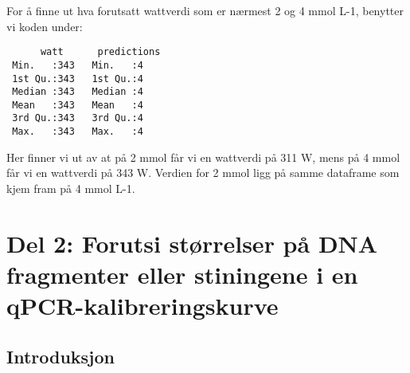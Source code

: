 \documentclass[
  letterpaper,
  DIV=11,
  numbers=noendperiod]{scrreprt}
\newenvironment{Shaded}{\begin{snugshade}}{\end{snugshade}}
\newcommand{\AttributeTok}[1]{\textcolor[rgb]{0.40,0.45,0.13}{#1}}
\newcommand{\CommentTok}[1]{\textcolor[rgb]{0.37,0.37,0.37}{#1}}
\newcommand{\DecValTok}[1]{\textcolor[rgb]{0.68,0.00,0.00}{#1}}
\newcommand{\FloatTok}[1]{\textcolor[rgb]{0.68,0.00,0.00}{#1}}
\newcommand{\FunctionTok}[1]{\textcolor[rgb]{0.28,0.35,0.67}{#1}}
\newcommand{\NormalTok}[1]{\textcolor[rgb]{0.00,0.23,0.31}{#1}}
\newcommand{\OtherTok}[1]{\textcolor[rgb]{0.00,0.23,0.31}{#1}}
\newcommand{\SpecialCharTok}[1]{\textcolor[rgb]{0.37,0.37,0.37}{#1}}
\begin{document}
For å finne ut hva forutsatt wattverdi som er nærmest 2 og 4 mmol L-1,
benytter vi koden under:

\begin{Shaded}
\end{Shaded}

\begin{verbatim}
      watt      predictions
 Min.   :343   Min.   :4   
 1st Qu.:343   1st Qu.:4   
 Median :343   Median :4   
 Mean   :343   Mean   :4   
 3rd Qu.:343   3rd Qu.:4   
 Max.   :343   Max.   :4   
\end{verbatim}

Her finner vi ut av at på 2 mmol får vi en wattverdi på 311 W, mens på 4
mmol får vi en wattverdi på 343 W. Verdien for 2 mmol ligg på samme
dataframe som kjem fram på 4 mmol L-1.

\section{Del 2: Forutsi størrelser på DNA fragmenter eller stiningene i
en
qPCR-kalibreringskurve}\label{del-2-forutsi-stuxf8rrelser-puxe5-dna-fragmenter-eller-stiningene-i-en-qpcr-kalibreringskurve}

\subsection{Introduksjon}\label{introduksjon-2}
\end{document}
